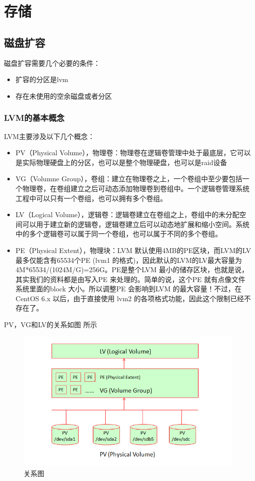 \chapter{存储}

\section{磁盘扩容}
磁盘扩容需要几个必要的条件：
\begin{itemize}
  \item 扩容的分区是lvm
  \item 存在未使用的空余磁盘或者分区
\end{itemize}

\subsection{LVM的基本概念}
LVM主要涉及以下几个概念：
\begin{itemize}
  \item PV（Physical Volume），物理卷：物理卷在逻辑卷管理中处于最底层，它可以是实际物理硬盘上的分区，也可以是整个物理硬盘，也可以是raid设备
  \item VG（Volumne Group），卷组：建立在物理卷之上，一个卷组中至少要包括一个物理卷，在卷组建立之后可动态添加物理卷到卷组中。一个逻辑卷管理系统工程中可以只有一个卷组，也可以拥有多个卷组。
  \item LV（Logical Volume），逻辑卷：逻辑卷建立在卷组之上，卷组中的未分配空间可以用于建立新的逻辑卷，逻辑卷建立后可以动态地扩展和缩小空间。系统中的多个逻辑卷可以属于同一个卷组，也可以属于不同的多个卷组。
  \item PE（Physical Extent），物理块：LVM 默认使用4MB的PE区块，而LVM的LV最多仅能含有65534个PE (lvm1 的格式)，因此默认的LVM的LV最大容量为4M*65534/(1024M/G)=256G。PE是整个LVM 最小的储存区块，也就是说，其实我们的资料都是由写入PE 来处理的。简单的说，这个PE 就有点像文件系统里面的block 大小。所以调整PE 会影响到LVM 的最大容量！不过，在 CentOS 6.x 以后，由于直接使用 lvm2 的各项格式功能，因此这个限制已经不存在了。
\end{itemize}

PV，VG和LV的关系如图 所示
\begin{figure}[H]
  \centering
  \includegraphics[scale=0.8]{lvm.png}
  \caption{关系图}
  \label{fig:lvm}
\end{figure}

